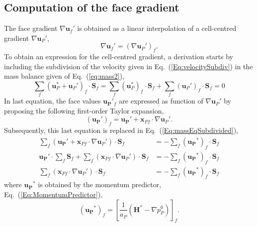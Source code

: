 \documentclass[final,3p,times,11pt,onecolumn]{myElsarticle}
\numberwithin{equation}{section}
\begin{document}
\subsection{Computation of the face gradient}
The face gradient $\nabla \boldsymbol{u}_f' $ is obtained as a linear interpolation of a cell-centred gradient $\nabla \boldsymbol{u}_P'$,
\begin{equation}
\label{Eq:UFaceGradient}
\nabla \boldsymbol{u}_f'
=
(\nabla \boldsymbol{u}_P')_f.
\end{equation}
To obtain an expression for the cell-centred gradient, a derivation starts by including the subdivision of the velocity given in Eq.~(\ref{Eq:velocitySubdiv}) in the mass balance given of Eq.~(\ref{eq:mass2}),
\begin{equation}
\label{Eq:massEqSubdivided}
\sum_{f} 
\left(
\boldsymbol{u}_{P}^*
+ 
\boldsymbol{u}_{P}'
\right)_f
\cdotp \textbf{S}_{f} 
=
\sum_{f} 
\left(
\boldsymbol{u}_{P}^*
\right)_f
\cdotp \textbf{S}_{f}
+
\sum_{f} 
\left(
\boldsymbol{u}_{P}'
\right)_f
\cdotp \textbf{S}_{f}
=
0
\end{equation}
In last equation, the face values $\boldsymbol{u_P}'_f$ are expressed as function of $\nabla \boldsymbol{u}_P'$ by proposing the following first-order Taylor expansion,
\begin{equation}
\label{Eq:TaylorOnFace}
\left(
\boldsymbol{u_P}'
\right)_f
=
\boldsymbol{u_P}'
+
\boldsymbol{x}_{Pf}
\cdot 
\nabla \boldsymbol{u}_P'.
\end{equation} 
Subsequently, this last equation is replaced in  Eq.~(\ref{Eq:massEqSubdivided}),
\begin{align}
\sum_f 
\left(
\boldsymbol{u_P}'
+
\boldsymbol{x}_{Pf}
\cdot 
\nabla \boldsymbol{u}_P'
\right)
\cdot 
\boldsymbol{S}_f 
&=
-\sum_f
\left(
\boldsymbol{u_P}^{*}
\right)_{f} 
\cdot 
\boldsymbol{S}_f
\\
\boldsymbol{u_P}'
\cdot 
\sum_f 
\boldsymbol{S}_f
+
\sum_f 
\left(
\boldsymbol{x}_{Pf}
\cdot 
\nabla \boldsymbol{u}_P'
\right)
\cdot 
\boldsymbol{S}_f
&=
-\sum_f
\left(
\boldsymbol{u_P}^{*}
\right)_{f} 
\cdot 
\boldsymbol{S}_f
\\
\label{Eq:Last}
\sum_f 
\left(
\boldsymbol{x}_{Pf}
\cdot 
\nabla \boldsymbol{u}_P'
\right)
\cdot 
\boldsymbol{S}_f
&=
-\sum_f
\left(
\boldsymbol{u_P}^{*}
\right)_{f} 
\cdot 
\boldsymbol{S}_f
\end{align}
where $\boldsymbol{u_P}^{*}$ is obtained by the momentum predictor, Eq.~(\ref{Eq:MomentumPredictor}),
\begin{equation}
\left(
\boldsymbol{u_P}^{*}
\right)_{f}
=
\left[\frac{1}{a_P}\left(\boldsymbol{H}^* - \nabla p_P^{0}\right)\right]_f.
\end{equation}
\end{document}
